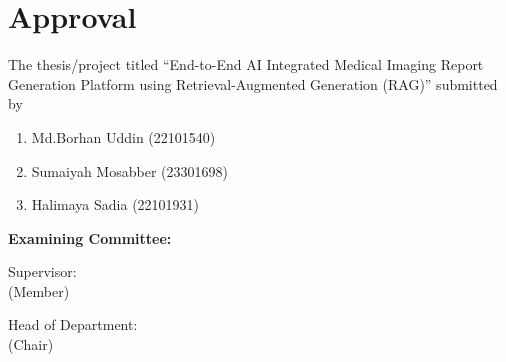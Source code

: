 \section*{Approval}

The thesis/project titled “End-to-End AI Integrated Medical Imaging Report Generation Platform using Retrieval-Augmented Generation (RAG)” submitted by 
\begin{enumerate}
  \item Md.Borhan Uddin (22101540)
  \item Sumaiyah Mosabber (23301698)
  \item Halimaya Sadia (22101931) 
  
\end{enumerate}

 

\vspace{0.5cm}
\textbf{Examining Committee:}

\vspace{1cm}

Supervisor:\\
(Member)
\begin{center}
    \hspace{7cm}  \hspace{1cm} 
\end{center}


Head of Department:\\
(Chair)
\begin{center}
    \hspace{7cm}  \hspace{1cm} 
\end{center}

\pagebreak